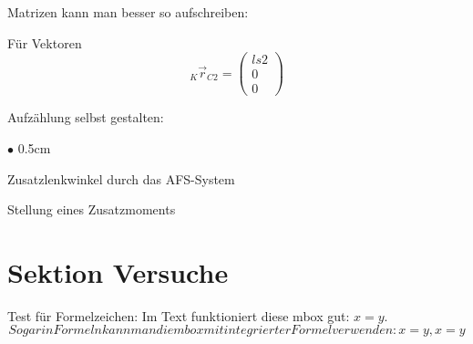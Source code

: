 




Matrizen kann man besser so aufschreiben:
%
%
%
%


Für Vektoren
\begin{equation}\label{Matrix_A_K_alpha_Beispiel}
\boxed{ _K\vec{r}_{C2}=
\begin{pmatrix}
ls2\\0\\0
\end{pmatrix}}
\end{equation}


Aufzählung selbst gestalten:
\begin{list}{$\bullet$}{\setlength
        {\leftmargin}{0.5cm}}
        \item Zusatzlenkwinkel durch das AFS-System
        \item Stellung eines Zusatzmoments
\end{list}




\section{Sektion Versuche}
\label{Sektion_Versuche}
Test für Formelzeichen: Im Text funktioniert diese mbox gut:
\mbox{$x = y$}.
\begin{equation}
 Sogar in Formeln kann man die mbox mit integrierter Formel
 verwenden:
 x = y, \mbox{$x = y$}
\end{equation}


